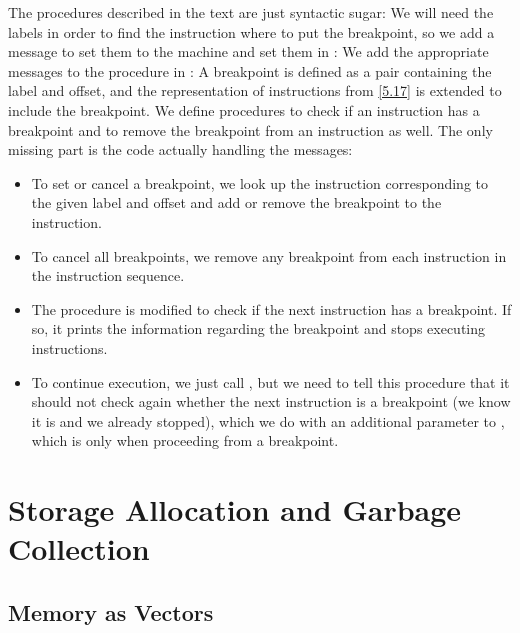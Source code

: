 \begin{exe}[5.19]
    The procedures described in the text are just syntactic sugar:
    We will need the labels in order to find the instruction where to put the 
    breakpoint, so we add a message to set them to the machine and set them in 
    :
    We add the appropriate messages to the  procedure in 
    :
    A breakpoint is defined as a pair containing the label and offset, and the 
    representation of instructions from \autoref{5.17} is extended to include 
    the breakpoint. We define procedures to check if an instruction has 
    a breakpoint and to remove the breakpoint from an instruction as well.
    The only missing part is the code actually handling the messages:
    \begin{itemize}
	\item To set or cancel a breakpoint, we look up the instruction 
	    corresponding to the given label and offset and add or remove the 
	    breakpoint to the instruction.
	\item To cancel all breakpoints, we remove any breakpoint from each 
	    instruction in the instruction sequence.
	\item The  procedure is modified to check if the next 
	    instruction has a breakpoint. If so, it prints the information 
	    regarding the breakpoint and stops executing instructions.
	\item To continue execution, we just call , but we need to 
	    tell this procedure that it should not check again whether the next 
	    instruction is a breakpoint (we know it is and we already stopped), 
	    which we do with an additional parameter to , which is 
	     only when proceeding from a breakpoint.
    \end{itemize}
\end{exe}

\section{Storage Allocation and Garbage Collection}

\subsection{Memory as Vectors}

